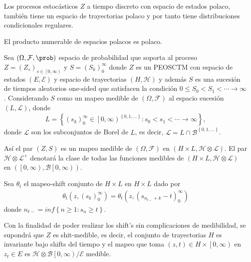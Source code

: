 \begin{Note}
Los procesos estoc\'asticos $Z$ a tiempo discreto con espacio de estados polaco, tambi\'en tiene un espacio de trayectorias polaco y por tanto tiene distribuciones condicionales regulares.
\end{Note}

\begin{Teo}
El producto numerable de espacios polacos es polaco.
\end{Teo}


\begin{Def}
Sea $\left(\Omega,\mathcal{F},\prob\right)$ espacio de probabilidad que soporta al proceso $Z=\left(Z_{s}\right)_{s\in\left[0,\infty\right)}$ y $S=\left(S_{k}\right)_{0}^{\infty}$ donde $Z$ es un PEOSCTM con espacio de estados $\left(E,\mathcal{E}\right)$  y espacio de trayectorias $\left(H,\mathcal{H}\right)$  y adem\'as $S$ es una sucesi\'on de tiempos aleatorios one-sided que satisfacen la condici\'on $0\leq S_{0}<S_{1}<\cdots\rightarrow\infty$. Considerando $S$ como un mapeo medible de $\left(\Omega,\mathcal{F}\right)$ al espacio sucesi\'on $\left(L,\mathcal{L}\right)$, donde 
\begin{eqnarray*}
L=\left\{\left(s_{k}\right)_{0}^{\infty}\in\left[0,\infty\right)^{\left\{0,1,\ldots\right\}}:s_{0}<s_{1}<\cdots\rightarrow\infty\right\},
\end{eqnarray*}
donde $\mathcal{L}$ son los subconjuntos de Borel de $L$, es decir, $\mathcal{L}=L\cap\mathcal{B}^{\left\{0,1,\ldots\right\}}$.

As\'i el par $\left(Z,S\right)$ es un mapeo medible de  $\left(\Omega,\mathcal{F}\right)$ en $\left(H\times L,\mathcal{H}\otimes\mathcal{L}\right)$. El par $\mathcal{H}\otimes\mathcal{L}^{+}$ denotar\'a la clase de todas las funciones medibles de $\left(H\times L,\mathcal{H}\otimes\mathcal{L}\right)$ en $\left(\left[0,\infty\right),\mathcal{B}\left[0,\infty\right)\right)$.
\end{Def}


\begin{Def}
Sea $\theta_{t}$ el mapeo-shift conjunto de $H\times L$ en $H\times L$ dado por
\begin{eqnarray*}
\theta_{t}\left(z,\left(s_{k}\right)_{0}^{\infty}\right)=\theta_{t}\left(z,\left(s_{n_{t-}+k}-t\right)_{0}^{\infty}\right)
\end{eqnarray*}
donde 
$n_{t-}=inf\left\{n\geq1:s_{n}\geq t\right\}$.
\end{Def}

\begin{Note}
Con la finalidad de poder realizar los shift's sin complicaciones de medibilidad, se supondr\'a que $Z$ es shit-medible, es decir, el conjunto de trayectorias $H$ es invariante bajo shifts del tiempo y el mapeo que toma $\left(z,t\right)\in H\times\left[0,\infty\right)$ en $z_{t}\in E$ es $\mathcal{H}\otimes\mathcal{B}\left[0,\infty\right)/\mathcal{E}$ medible.
\end{Note}


